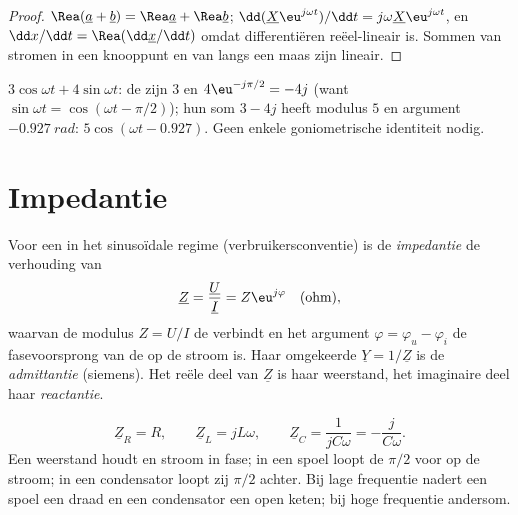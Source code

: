 \begin{proof}
$\Rea(\underline a + \underline b) = \Rea\underline a + \Rea\underline b$;
$\dd(\underline X\eu^{j\omega t})/\dd t = j\omega\underline X\eu^{j\omega t}$,
en $\dd x/\dd t = \Rea(\dd\underline x/\dd t)$ omdat differentiëren
reëel-lineair is. Sommen van stromen in een knooppunt en van  langs een
maas zijn lineair.
\end{proof}

\begin{example}\label{ex:b1:sinusoidal-impedance:add}
$3\cos\omega t + 4\sin\omega t$: de  zijn $3$ en
$4\eu^{-j\pi/2} = -4j$ (want $\sin\omega t = \cos(\omega t - \pi/2)$);
hun som $3 - 4j$ heeft modulus $5$ en argument $-0.927\ \unit{rad}$:
$5\cos(\omega t - 0.927)$. Geen enkele goniometrische identiteit nodig.
\end{example}

\section{Impedantie}

\begin{definition}\label{def:b1:sinusoidal-impedance:impedance}
Voor een  in het sinusoïdale regime
(verbruikersconventie) is de \emph{impedantie} de verhouding van 
\[
\underline Z = \frac{\underline U}{\underline I} = Z\eu^{j\varphi}
\quad (\text{ohm}),
\]
waarvan de modulus $Z = U/I$ de  verbindt en het argument
$\varphi = \varphi_u - \varphi_i$ de fasevoorsprong van de  op
de stroom is. Haar omgekeerde $\underline Y = 1/\underline Z$ is de
\emph{admittantie} (siemens). Het reële deel van $\underline Z$ is haar
weerstand, het imaginaire deel haar \emph{reactantie}.
\end{definition}

\begin{proposition}\label{prop:b1:sinusoidal-impedance:rlc}
\[
\underline Z_R = R, \qquad \underline Z_L = jL\omega, \qquad
\underline Z_C = \frac{1}{jC\omega} = -\frac{j}{C\omega} .
\]
Een weerstand houdt  en stroom in fase; in een spoel loopt de 
$\pi/2$ voor op de stroom; in een condensator loopt zij $\pi/2$ achter. Bij lage
frequentie nadert een spoel een draad en een condensator een open keten; bij
hoge frequentie andersom.
\end{proposition}

